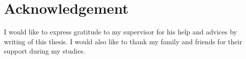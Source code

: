 \chapter*{Acknowledgement}
\vfil
I would like to express gratitude to my supervisor \supervisor for his help and advices by writing of this thesis. I would also like to thank my family and friends for their support during my studies.
